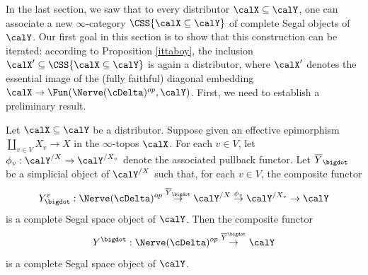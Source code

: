 In the last section, we saw that to every distributor $\calX \subseteq \calY$, one can
associate a new $\infty$-category $\CSS{\calX \subseteq \calY}$ of complete Segal objects of $\calY$. 
Our first goal in this section is to show that this construction can be iterated: according to 
Proposition \ref{ittaboy}, the inclusion $\calX' \subseteq \CSS{ \calX \subseteq \calY}$
is again a distributor, where $\calX'$ denotes the essential image of the
(fully faithful) diagonal embedding $\calX \rightarrow \Fun( \Nerve(\cDelta)^{op}, \calY)$.
First, we need to establish a preliminary result.

\begin{lemma}\label{stumple}
Let $\calX \subseteq \calY$ be a distributor. Suppose given an effective epimorphism
$\coprod_{v \in V} X_{v} \rightarrow X$ in the $\infty$-topos $\calX$. For each $v \in V$, let
$\phi_v: \calY^{/X} \rightarrow \calY^{/X_v}$ denote the associated pullback functor.
Let $\overline{Y}_{\bigdot}$ be a simplicial object of $\calY^{/X}$ such that, for each $v \in V$, the composite functor
$$ Y^{v}_{\bigdot}: \Nerve(\cDelta)^{op} \stackrel{\overline{Y}_{\bigdot}}{\rightarrow} \calY^{/X} \stackrel{ \phi_v}{\rightarrow}
\calY^{/X_v} \rightarrow \calY$$
is a complete Segal space object of $\calY$. Then the composite functor
$$ Y^{\bigdot}: \Nerve(\cDelta)^{op} \stackrel{ \overline{Y}^{\bigdot} }{\rightarrow} \calY$$
is a complete Segal space object of $\calY$.
\end{lemma}


